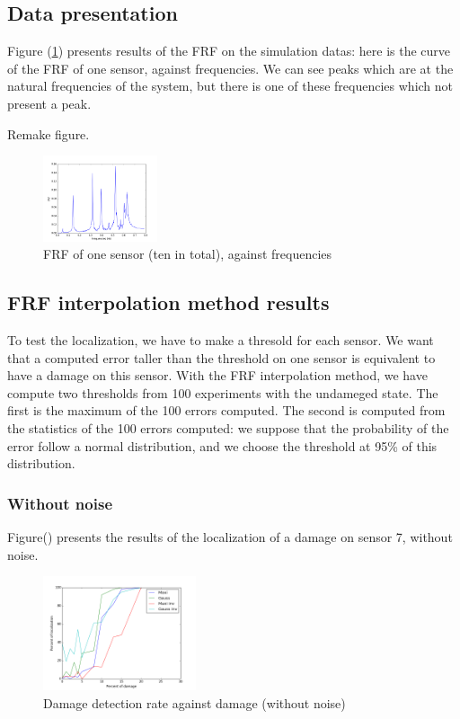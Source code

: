 \documentclass[journal]{IEEEtran}
\begin{document}
\subsection{Data presentation}

Figure (\ref{frf_freq}) presents results of the FRF on the simulation datas: here is the curve of the FRF of one sensor, against frequencies. We can see peaks which are at the natural frequencies of the system, but there is one of these frequencies which not present a peak.

Remake figure.

\begin{figure}[h!]
  \centering
  \includegraphics[width=0.3\textwidth]{images/persensor1.png}
  \caption{FRF of one sensor (ten in total), against frequencies}
  \label{frf_freq}
\end{figure}



\subsection{FRF interpolation method results}

To test the localization, we have to make a thresold for each sensor. We want that a computed error taller than the threshold on one sensor is equivalent to have a damage on this sensor. With the FRF interpolation method, we have compute two thresholds from 100 experiments with the undameged state. The first is the maximum of the 100 errors computed. The second is computed from the statistics of the 100 errors computed: we suppose that the probability of the error follow a normal distribution, and we choose the threshold at 95\% of this distribution. 


\subsubsection{Without noise}

Figure() presents the results of the localization of a damage on sensor 7, without noise.


\begin{figure}[h!]
  \centering
  \includegraphics[width=0.4\textwidth]{images/detect004.png}
  \caption{Damage detection rate against damage (without noise)}
  \label{detect}
\end{figure}
\end{document}
